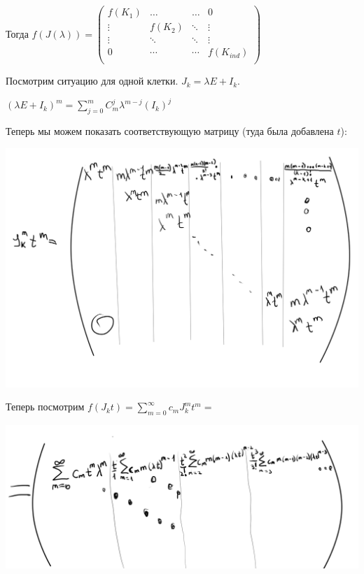 Тогда $f(J(\lambda)) = \begin{pmatrix}
   f(K_1) & \ldots & \ldots & 0 \\
    \vdots & f(K_2) & \ddots & \vdots\\
    \vdots & \ddots & \ddots & \vdots\\
    0 & \cdots & \cdots & f(K_{ind})\\
\end{pmatrix}$

Посмотрим ситуацию для одной клетки. $J_k = \lambda E + I_k$.

$(\lambda E + I_k)^m = \sum\limits_{j=0}^m C_m^j \lambda^{m-j} (I_k)^j  $ %

Теперь мы можем показать соответствующую матрицу (туда была добавлена $t$):
\begin{center}
 \includegraphics[width = 15cm]{assets/7_10-function.png}    
\end{center}
Теперь посмотрим $f(J_kt)=\sum\limits_{m=0}^{\infty}c_m J_k^mt^m = $
\begin{center}
 \includegraphics[width = 15cm]{assets/7_10-limit-function.png}    
\end{center}

